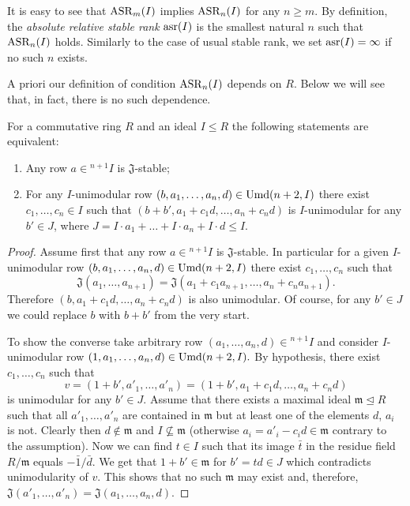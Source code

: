 It is easy to see that $\operatorname{ASR}_m(I)$ implies $\operatorname{ASR}_n(I)$ for any $n\geqslant m$. 
By definition, the \emph{absolute relative stable rank} $\operatorname{asr}(I)$ is the smallest natural $n$ such that $\operatorname{ASR}_n(I)$ holds. 
Similarly to the case of usual stable rank, we set $\operatorname{asr}(I)=\infty$ if no such $n$ exists.

A priori our definition of condition $\operatorname{ASR}_n(I)$ depends on $R$.
Below we will see that, in fact, there is no such dependence.
\begin{lemma}\label{lemma:relative-asr-unimod}
For a commutative ring $R$ and an ideal $I \leq R$ the following statements are equivalent:
\begin{enumerate} \item\label{asr-j-stable} Any row $a\in{}^{n+1}\!I$ is $\mathfrak{J}$-stable;
\item\label{asr-bak-like} For any $I$-unimodular row $(b,a_1,\ldots,a_n,d)\in\operatorname{Umd}(n+2,I)$ there exist $c_1,\ldots,c_n\in I$ 
 such that $(b+b',a_1+c_1d,\ldots,a_n+c_nd)$ is $I$-unimodular for any $b'\in J$, where $J=I \cdot a_1 + \ldots + I \cdot a_n + I \cdot d\leq I$.
\end{enumerate} 
\end{lemma}
\begin{proof}
Assume first that any row $a\in{}^{n+1}\!I$ is $\mathfrak{J}$-stable. 
In particular for a given $I$-unimodular row $(b,a_1,\ldots,a_n,d)\in\operatorname{Umd}(n+2,I)$ there exist $c_1,\ldots,c_n$ such that
\[\mathfrak{J}(a_1,\ldots,a_{n+1})=\mathfrak{J}(a_1+c_1a_{n+1},\ldots,a_n+c_na_{n+1}).\]
Therefore $(b,a_1+c_1d,\ldots,a_n+c_nd)$ is also unimodular. Of course, for any $b'\in J$ we could replace $b$ with $b+b'$ from the very start.

To show the converse take arbitrary row $(a_1,\ldots,a_n,d)\in{}^{n+1}\!I$ and consider $I$-unimodular row $(1,a_1,\ldots,a_n,d)\in\operatorname{Umd}(n+2,I).$
By hypothesis, there exist $c_1,\ldots,c_n$ such that \[ v=(1+b',a'_1,\ldots,a'_n)=(1+b',a_1+c_1d,\ldots,a_n+c_nd) \] is unimodular for any $b'\in J$.
Assume that there exists a maximal ideal $\mathfrak{m}\trianglelefteq R$ such that all $a'_1,\ldots,a'_n$ are contained in $\mathfrak{m}$
 but at least one of the elements $d$, $a_i$ is not.
Clearly then $d\notin\mathfrak{m}$ and $I\not\subseteq \mathfrak{m}$ (otherwise $a_i=a'_i-c_id\in\mathfrak{m}$ contrary to the assumption).
Now we can find $t\in I$ such that its image $\bar{t}$ in the residue field $R/\mathfrak{m}$ equals $-\bar{1}/\bar{d}$.
We get that $1 + b' \in \mathfrak{m}$ for $b'=td\in J$ which contradicts unimodularity of $v$.
This shows that no such $\mathfrak{m}$ may exist and, therefore, $\mathfrak{J}(a'_1,\ldots,a'_n)=\mathfrak{J}(a_1,\ldots,a_n,d)$.
\end{proof}

